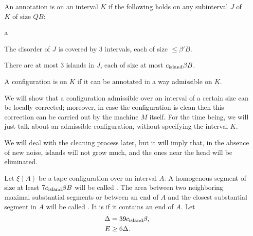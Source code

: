\documentclass[11pt]{memoir}
\theoremstyle{definition} %
\renewcommand{\le}{\leq}
\renewcommand{\ge}{\geq}
\def\B{B}
\newcommand{\E}{E}
\newcommand{\Q}{Q}
\newcommand{\cns}[1]{c_{\textrm{\upshape #1}}}
\begin{document}
\begin{definition}[Admissibility]\label{def:admissible}
An annotation is  on an interval \( K \) if the following holds on any subinterval 
\( J \) of \( K \) of size \( \Q\B \):
\begin{varenum}[series=admissible]{a}
\item The disorder of \( J \) is covered by 3 intervals, each of size \( \le \beta'\B \).
\item There are at most 3 islands in \( J \), each of size at most \( \cns{island}\beta\B \).
\end{varenum}
A configuration is  on \( K \) if it can be annotated in a way admissible on \( K \).
\end{definition}

We will show that a configuration admissible over an interval of a certain size can be locally corrected;
moreover, in case the configuration is clean then this correction
can be carried out by the machine \( M \) itself.
For the time being, we will just talk about an admissible configuration, without specifying the interval
\( K \).

We will deal with the cleaning process later, but it will imply that,
in the absence of new noise, islands will not grow much, and the ones near the head
will be eliminated.

\begin{definition}\label{def:substantial}
Let \( \xi(A) \) be a tape configuration over an interval \( A \).
A homogenous segment of size at least \( 7\cns{island}\beta\B \)
will be called .
The area between two neighboring maximal
substantial segments or between an end of \( A \) and the closest substantial segment in \( A \)
will be called .
It is  if it contains an end of \( A \).
  Let
 \begin{align*}
     \Delta &= 39\cns{island}\beta, %
\\  \E  &\ge 6\Delta. %
 \end{align*}
\end{definition}
\end{document}
